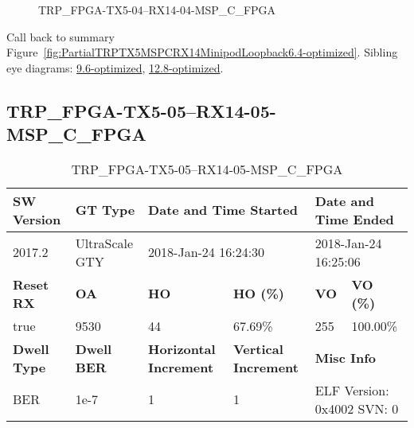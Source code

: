 \begin{figure}[h]
\caption{TRP\_FPGA-TX5-04--RX14-04-MSP\_C\_FPGA} \label{fig:TRPFPGATX504RX1404MSPCFPGA6.4-optimized}
\end{figure}

Call back to summary Figure~\ref{fig:PartialTRPTX5MSPCRX14MinipodLoopback6.4-optimized}.
Sibling eye diagrams: \hyperref[sec:TRPFPGATX504RX1404MSPCFPGA9.6-optimized]{9.6-optimized}, \hyperref[sec:TRPFPGATX504RX1404MSPCFPGA12.8-optimized]{12.8-optimized}.

\clearpage
\newpage


\subsection{TRP\_FPGA-TX5-05--RX14-05-MSP\_C\_FPGA}\label{sec:TRPFPGATX505RX1405MSPCFPGA6.4-optimized}

\begin{table}[h]
\centering
\caption{TRP\_FPGA-TX5-05--RX14-05-MSP\_C\_FPGA}
\label{tab:TRPFPGATX505RX1405MSPCFPGA6.4-optimized}
\begin{tabular}{@{}|l|l|l|l|l|l|@{}}
\toprule
\textbf{SW Version}                & \textbf{GT Type}   & \multicolumn{2}{l|}{\textbf{Date and Time Started}}            & \multicolumn{2}{l|}{\textbf{Date and Time Ended}}        \\ \midrule
2017.2                       & UltraScale GTY          & \multicolumn{2}{l|}{2018-Jan-24 16:24:30}                   & \multicolumn{2}{l|}{2018-Jan-24 16:25:06}               \\ \midrule
\textbf{Reset RX}                  & \textbf{OA} & \textbf{HO}   & \textbf{HO (\%)} & \textbf{VO} & \textbf{VO (\%)} \\ \midrule
true & 9530        & 44          & 67.69\%        & 255        & 100.00\%       \\ \midrule
\textbf{Dwell Type}                & \textbf{Dwell BER} & \textbf{Horizontal Increment} & \textbf{Vertical Increment}    & \multicolumn{2}{l|}{\textbf{Misc Info}}                  \\ \midrule
BER                            & 1e-7        & 1        & 1           & \multicolumn{2}{l|}{ELF Version: 0x4002 SVN: 0}                         \\ \bottomrule
\end{tabular}
\end{table}


